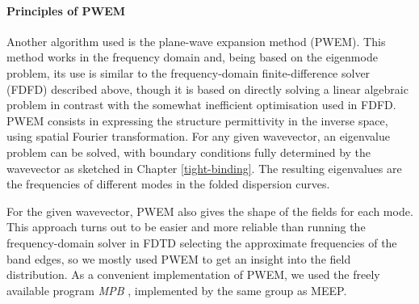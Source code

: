 \paragraph{Principles of PWEM} %
Another algorithm used is the plane-wave expansion method (PWEM). This method works in the frequency domain and, being based on the eigenmode problem, its use is similar to the frequency-domain finite-difference solver (FDFD) described above, though it is based on directly solving a linear algebraic problem in contrast with the somewhat inefficient optimisation used in FDFD.
PWEM consists in expressing the structure permittivity in the inverse space, using spatial Fourier transformation. For any given wavevector, an eigenvalue problem can be solved, with boundary conditions fully determined by the wavevector as sketched in Chapter \ref{tight-binding}. The resulting eigenvalues are the frequencies of different modes in the folded dispersion curves.  


For the given wavevector, PWEM also gives the shape of the fields for each mode. This approach turns out to be easier and more reliable than running the frequency-domain solver in FDTD selecting the approximate frequencies of the band edges, so we mostly used PWEM to get an insight into the field distribution. 
As a convenient implementation of PWEM, we used the freely available program \textit{MPB} \cite{johnson2001mpb}, implemented by the same group as MEEP.


